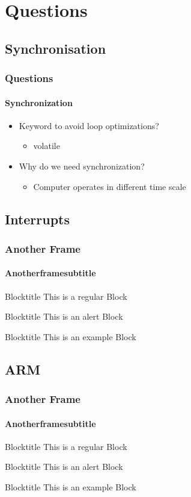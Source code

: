 \section{Questions}
\subsection{Synchronisation}
\begin{frame}
    \frametitle{Questions}
    \framesubtitle{Synchronization}
    \begin{itemize}
        \item Keyword to avoid loop optimizations?
        \begin{itemize}
        	\item volatile
        \end{itemize}
        \item Why do we need synchronization?
        \begin{itemize}
        	\item Computer operates in different time scale
        \end{itemize}
    \end{itemize}
\end{frame}

\subsection{Interrupts}
\begin{frame}
    \frametitle{Another Frame}
    \framesubtitle{Anotherframesubtitle}
    \begin{block}{Blocktitle}
        This is a regular Block
    \end{block}
    \begin{alertblock}{Blocktitle}
        This is an alert Block
    \end{alertblock}
    \begin{exampleblock}{Blocktitle}
        This is an example Block
    \end{exampleblock}
\end{frame}

\subsection{ARM}
\begin{frame}
    \frametitle{Another Frame}
    \framesubtitle{Anotherframesubtitle}
    \begin{block}{Blocktitle}
        This is a regular Block
    \end{block}
    \begin{alertblock}{Blocktitle}
        This is an alert Block
    \end{alertblock}
    \begin{exampleblock}{Blocktitle}
        This is an example Block
    \end{exampleblock}
\end{frame}
